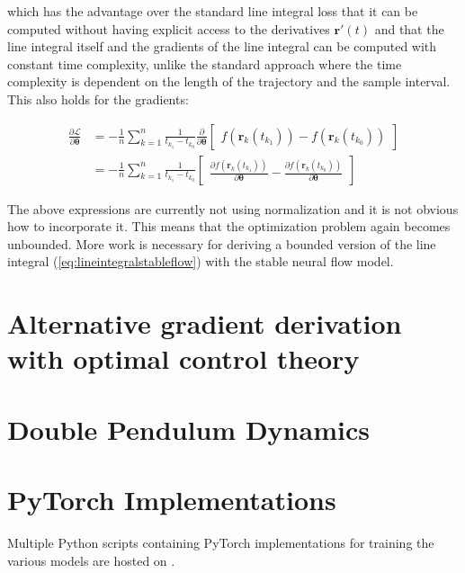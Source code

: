 \documentclass[12pt,a4paper]{book}
\begin{document}
\noindent which has the advantage over the standard line integral loss that it can be computed without having explicit access to the derivatives $\bm{r}'(t)$ and that the line integral itself and the gradients of the line integral can be computed with constant time complexity, unlike the standard approach where the time complexity is dependent on the length of the trajectory and the sample interval. This also holds for the gradients:

\begin{equation}
    \begin{aligned}
        \frac{\partial \mathcal{L}}{\partial \bm{\theta}}
        &= - \frac{1}{n} \sum_{k=1}^{n} \frac{1}{t_{k_1} - t_{k_0}} \frac{\partial}{\partial \bm{\theta}} \begin{bmatrix} f(\bm{r}_k(t_{k_1})) - f(\bm{r}_k(t_{k_0})) \end{bmatrix} \\
        &= - \frac{1}{n} \sum_{k=1}^{n} \frac{1}{t_{k_1} - t_{k_0}} \begin{bmatrix} \frac{\partial f(\bm{r}_k(t_{k_1}))}{\partial \bm{\theta}} - \frac{\partial f(\bm{r}_k(t_{k_0}))}{\partial \bm{\theta}} \end{bmatrix}
    \end{aligned}
\end{equation}

The above expressions are currently not using normalization and it is not obvious how to incorporate it. This means that the optimization problem again becomes unbounded. More work is necessary for deriving a bounded version of the line integral (\ref{eq:lineintegralstableflow}) with the stable neural flow model.

\backmatter



\appendixpage

\renewcommand{\thesection}{\Alph{section}}

\appendix

\section{Alternative gradient derivation with optimal control theory}
\label{appendix:optimalcontroladjoints}

\newpage

\section{Double Pendulum Dynamics}
\label{appendix:doublependiulumdynamics}

\newpage

\section{PyTorch Implementations}
\label{appendix:sourcecode}

Multiple Python scripts containing PyTorch implementations for training the various models are hosted on \href{https://github.com/aljhn/master_project}{\color{cyan}{GitHub}}.
\end{document}

